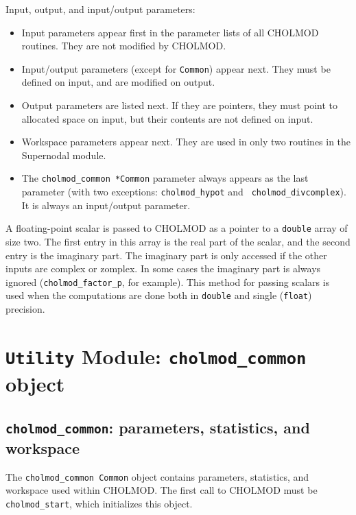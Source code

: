 \documentclass[11pt]{article}
\begin{document}
\noindent
Input, output, and input/output parameters:
\begin{itemize}
\item Input parameters appear first in the parameter lists of all CHOLMOD
routines.  They are not modified by CHOLMOD.
\item Input/output parameters (except for {\tt Common}) appear next.
They must be defined on input, and are modified on output.
\item Output parameters are listed next.  If they are pointers, they must
point to allocated space on input, but their contents are not defined on input.
\item Workspace parameters appear next.  They are used in only two routines in
the Supernodal module.
\item The {\tt cholmod\_common *Common} parameter always appears as the last
parameter (with two exceptions: {\tt cholmod\_hypot} and {\tt
cholmod\_divcomplex}).  It is always an input/output parameter.
\end{itemize}

A floating-point scalar is passed to CHOLMOD as a pointer to a {\tt double}
array of size two.  The first entry in this array is the real part of the
scalar, and the second entry is the imaginary part.  The imaginary part is
only accessed if the other inputs are complex or zomplex.  In some cases
the imaginary part is always ignored ({\tt cholmod\_factor\_p}, for example).
This method for passing scalars is used when the computations are done
both in {\tt double} and single ({\tt float}) precision.

\newpage \section{{\tt Utility} Module: {\tt cholmod\_common} object}
\label{cholmod_common}

\subsection{{\tt cholmod\_common}: parameters, statistics, and workspace}


The {\tt cholmod\_common Common} object contains parameters, statistics, and
workspace used within CHOLMOD.  The first call to CHOLMOD must be
{\tt cholmod\_start}, which initializes this object.
\end{document}
